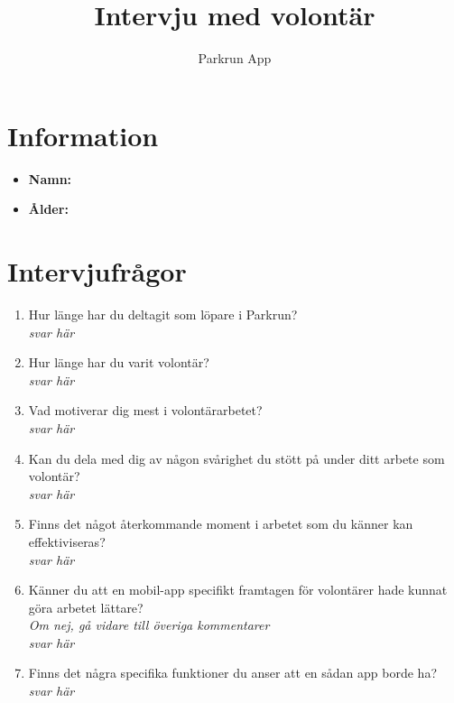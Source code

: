 \documentclass{article}
\title{\textbf{Intervju med volontär}}
\author{Parkrun App}
\date{}
\begin{document}
\maketitle
\thispagestyle{empty}
\section*{Information}
\begin{itemize}[label=]
    \item \textbf{Namn:} 
    \item \textbf{Ålder:} 
\end{itemize}

\section*{Intervjufrågor}
\begin{enumerate}[label=\textbf{Fråga \arabic*:}]
    \item Hur länge har du deltagit som löpare i Parkrun?\\
        \textit{svar här}
    \item Hur länge har du varit volontär?\\
        \textit{svar här}
    \item Vad motiverar dig mest i volontärarbetet?\\
        \textit{svar här}
    \item Kan du dela med dig av någon svårighet du stött på under ditt arbete som volontär?\\
        \textit{svar här}
    \item Finns det något återkommande moment i arbetet som du känner kan effektiviseras?\\
        \textit{svar här}
    \item Känner du att en mobil-app specifikt framtagen för volontärer hade kunnat göra arbetet lättare?\\
    \textit{Om nej, gå vidare till överiga kommentarer}\\
        \textit{svar här}
    \item Finns det några specifika funktioner du anser att en sådan app borde ha?\\
        \textit{svar här}
\end{enumerate}
\end{document}
